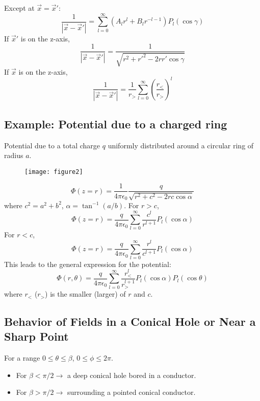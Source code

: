 \documentclass{article}
\begin{document}
	Except at $\vec{x}=\vec{x}'$:
	\begin{equation}
		\frac{1}{|\vec{x}-\vec{x}'|} = \sum_{l=0}^{\infty} (A_l r^l + B_l r^{-l-1}) P_l(\cos\gamma)
	\end{equation}
	If $\vec{x}'$ is on the z-axis,
	\begin{equation}
		\frac{1}{|\vec{x}-\vec{x}'|} = \frac{1}{\sqrt{r^2+r'^2 - 2rr'\cos\gamma}}
	\end{equation}
	If $\vec{x}$ is on the z-axis,
	\begin{equation}
		\frac{1}{|\vec{x}-\vec{x}'|} = \frac{1}{r_>} \sum_{l=0}^{\infty} \left(\frac{r_<}{r_>}\right)^l
	\end{equation}
	
	\subsection{Example: Potential due to a charged ring}
	Potential due to a total charge $q$ uniformly distributed around a circular ring of radius $a$. 
	
	\begin{figure}[h]
		\centering
		\texttt{[image: figure2]}
		\caption{}
		\label{fig:figure2}
	\end{figure}
	
	\begin{equation}
		\Phi(z=r) = \frac{1}{4\pi\epsilon_0} \frac{q}{\sqrt{r^2+c^2-2rc\cos\alpha}}
	\end{equation}
	where $c^2=a^2+b^2$, $\alpha = \tan^{-1}(a/b)$.
	For $r>c$,
	\begin{equation}
		\Phi(z=r) = \frac{q}{4\pi\epsilon_0} \sum_{l=0}^{\infty} \frac{c^l}{r^{l+1}} P_l(\cos\alpha)
	\end{equation}
	For $r<c$,
	\begin{equation}
		\Phi(z=r) = \frac{q}{4\pi\epsilon_0} \sum_{l=0}^{\infty} \frac{r^l}{c^{l+1}} P_l(\cos\alpha)
	\end{equation}
	This leads to the general expression for the potential:
	\begin{equation}
		\Phi(r, \theta) = \frac{q}{4\pi\epsilon_0} \sum_{l=0}^{\infty} \frac{r_<^l}{r_>^{l+1}} P_l(\cos\alpha) P_l(\cos\theta)
	\end{equation}
	where $r_<$ ($r_>$) is the smaller (larger) of $r$ and $c$.
	
	\subsection{Behavior of Fields in a Conical Hole or Near a Sharp Point}
	For a range $0 \le \theta \le \beta$, $0 \le \phi \le 2\pi$.
	\begin{itemize}
		\item For $\beta < \pi/2 \rightarrow$ a deep conical hole bored in a conductor.
		\item For $\beta > \pi/2 \rightarrow$ surrounding a pointed conical conductor.
	\end{itemize}
	
\end{document}
